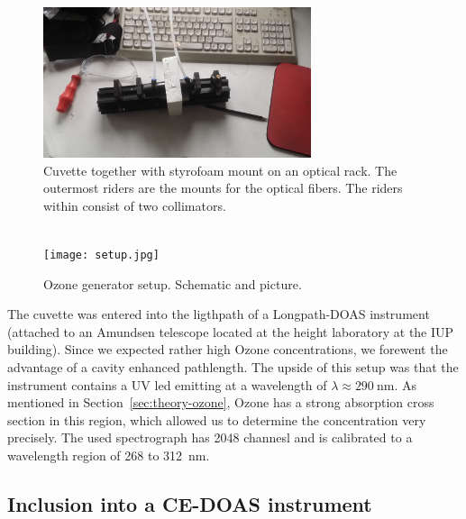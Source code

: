 \begin{figure}[htbp]
  \centering
  \includegraphics[width=0.7\textwidth]{images/cuvette.jpg}
  \caption{Cuvette together with styrofoam mount on an optical
    rack. The outermost riders are the mounts for the optical
    fibers. The riders within consist of two collimators.}
  \label{fig:cuvette}
\end{figure}

\begin{figure}[htbp]
  \centering
  {
  \def\svgwidth{0.9\linewidth}
  
  }
  \phantom{h}\\
  \vspace{2cm}
  \texttt{[image: setup.jpg]}
  \caption{Ozone generator setup. Schematic and picture.}
  \label{fig:setup}
\end{figure}

The cuvette was entered into the ligthpath of a Longpath-DOAS
instrument (attached to an Amundsen telescope located at the height
laboratory at the IUP building). Since we expected rather high Ozone
concentrations, we forewent the advantage of a cavity enhanced
pathlength. The upside of this setup was that the instrument contains
a UV led emitting at a wavelength of $\lambda \approx
\SI{290}{\nano\meter}$. As mentioned in
Section~\ref{sec:theory-ozone}, Ozone has a strong absorption cross
section in this region, which allowed us to determine the
concentration very precisely.  The used spectrograph has 2048 channesl
and is calibrated to a wavelength region of \num{268} to
\SI{312}{\nano\meter}.

\subsection{Inclusion into a CE-DOAS instrument}
\label{sec:inclusion}

